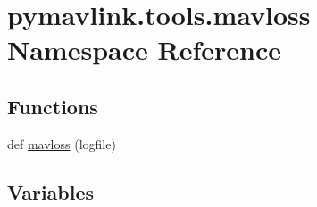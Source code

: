 \hypertarget{namespacepymavlink_1_1tools_1_1mavloss}{}\section{pymavlink.\+tools.\+mavloss Namespace Reference}
\label{namespacepymavlink_1_1tools_1_1mavloss}
\subsection*{Functions}
\begin{DoxyCompactItemize}
\item 
def \hyperlink{namespacepymavlink_1_1tools_1_1mavloss_ad6189b16a6cc39452070425c82c2835b}{mavloss} (logfile)
\end{DoxyCompactItemize}
\subsection*{Variables}
